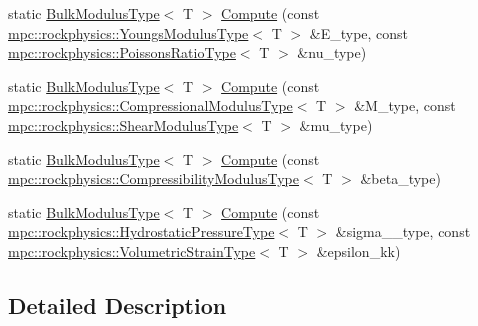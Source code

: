 \begin{DoxyCompactItemize}
\item 
static \mbox{\hyperlink{structmpc_1_1rockphysics_1_1_bulk_modulus_type}{Bulk\+Modulus\+Type}}$<$ T $>$ \mbox{\hyperlink{structmpc_1_1rockphysics_1_1_rock_physics_transforms_3_01_t_00_01mpc_1_1rockphysics_1_1_bulk_modulus_type_3_01_t_01_4_01_4_a34cdaa1d293d2109361b218e0d40edef}{Compute}} (const \mbox{\hyperlink{structmpc_1_1rockphysics_1_1_youngs_modulus_type}{mpc\+::rockphysics\+::\+Youngs\+Modulus\+Type}}$<$ T $>$ \&E\+\_\+type, const \mbox{\hyperlink{structmpc_1_1rockphysics_1_1_poissons_ratio_type}{mpc\+::rockphysics\+::\+Poissons\+Ratio\+Type}}$<$ T $>$ \&nu\+\_\+type)
\item 
static \mbox{\hyperlink{structmpc_1_1rockphysics_1_1_bulk_modulus_type}{Bulk\+Modulus\+Type}}$<$ T $>$ \mbox{\hyperlink{structmpc_1_1rockphysics_1_1_rock_physics_transforms_3_01_t_00_01mpc_1_1rockphysics_1_1_bulk_modulus_type_3_01_t_01_4_01_4_ab5af4b1efcaf09664386e4ced821f93a}{Compute}} (const \mbox{\hyperlink{structmpc_1_1rockphysics_1_1_compressional_modulus_type}{mpc\+::rockphysics\+::\+Compressional\+Modulus\+Type}}$<$ T $>$ \&M\+\_\+type, const \mbox{\hyperlink{structmpc_1_1rockphysics_1_1_shear_modulus_type}{mpc\+::rockphysics\+::\+Shear\+Modulus\+Type}}$<$ T $>$ \&mu\+\_\+type)
\item 
static \mbox{\hyperlink{structmpc_1_1rockphysics_1_1_bulk_modulus_type}{Bulk\+Modulus\+Type}}$<$ T $>$ \mbox{\hyperlink{structmpc_1_1rockphysics_1_1_rock_physics_transforms_3_01_t_00_01mpc_1_1rockphysics_1_1_bulk_modulus_type_3_01_t_01_4_01_4_ae42a981ebb07f64fd73eb57402614a57}{Compute}} (const \mbox{\hyperlink{structmpc_1_1rockphysics_1_1_compressibility_modulus_type}{mpc\+::rockphysics\+::\+Compressibility\+Modulus\+Type}}$<$ T $>$ \&beta\+\_\+type)
\item 
static \mbox{\hyperlink{structmpc_1_1rockphysics_1_1_bulk_modulus_type}{Bulk\+Modulus\+Type}}$<$ T $>$ \mbox{\hyperlink{structmpc_1_1rockphysics_1_1_rock_physics_transforms_3_01_t_00_01mpc_1_1rockphysics_1_1_bulk_modulus_type_3_01_t_01_4_01_4_a97d6e68c3ad8449a3c7f07e9d760161a}{Compute}} (const \mbox{\hyperlink{structmpc_1_1rockphysics_1_1_hydrostatic_pressure_type}{mpc\+::rockphysics\+::\+Hydrostatic\+Pressure\+Type}}$<$ T $>$ \&sigma\+\_\+\_\+type, const \mbox{\hyperlink{structmpc_1_1rockphysics_1_1_volumetric_strain_type}{mpc\+::rockphysics\+::\+Volumetric\+Strain\+Type}}$<$ T $>$ \&epsilon\+\_\+kk)
\end{DoxyCompactItemize}


\subsection{Detailed Description}
